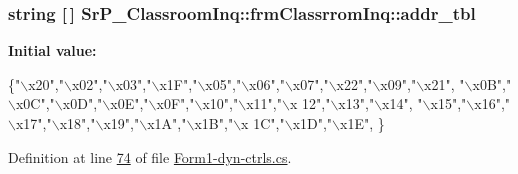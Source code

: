 \hypertarget{class_sr_p___classroom_inq_1_1frm_classrrom_inq_a0f417902be6534cb30d93b2c0d836165}{
\subsubsection[{addr\-\_\-tbl}]{\setlength{\rightskip}{0pt plus 5cm}string \mbox{[}$\,$\mbox{]} {\bf \-Sr\-P\-\_\-\-Classroom\-Inq\-::frm\-Classrrom\-Inq\-::addr\-\_\-tbl}}}
\label{class_sr_p___classroom_inq_1_1frm_classrrom_inq_a0f417902be6534cb30d93b2c0d836165}
{\bfseries \-Initial value\-:}
\begin{DoxyCode}
 \{\textcolor{stringliteral}{"\(\backslash\)x20"},\textcolor{stringliteral}{"\(\backslash\)x02"},\textcolor{stringliteral}{"\(\backslash\)x03"},\textcolor{stringliteral}{"\(\backslash\)x1F"},\textcolor{stringliteral}{"\(\backslash\)x05"},\textcolor{stringliteral}{"\(\backslash\)x06"},\textcolor{stringliteral}{"\(\backslash\)x07"},\textcolor{stringliteral}{"\(\backslash\)x22"},\textcolor{stringliteral}{"\(\backslash\)x09"},\textcolor{stringliteral}{"\(\backslash\)x21"},
                           \textcolor{stringliteral}{"\(\backslash\)x0B"},\textcolor{stringliteral}{"\(\backslash\)x0C"},\textcolor{stringliteral}{"\(\backslash\)x0D"},\textcolor{stringliteral}{"\(\backslash\)x0E"},\textcolor{stringliteral}{"\(\backslash\)x0F"},\textcolor{stringliteral}{"\(\backslash\)x10"},\textcolor{stringliteral}{"\(\backslash\)x11"},\textcolor{stringliteral}{"\(\backslash\)x
      12"},\textcolor{stringliteral}{"\(\backslash\)x13"},\textcolor{stringliteral}{"\(\backslash\)x14"},
                           \textcolor{stringliteral}{"\(\backslash\)x15"},\textcolor{stringliteral}{"\(\backslash\)x16"},\textcolor{stringliteral}{"\(\backslash\)x17"},\textcolor{stringliteral}{"\(\backslash\)x18"},\textcolor{stringliteral}{"\(\backslash\)x19"},\textcolor{stringliteral}{"\(\backslash\)x1A"},\textcolor{stringliteral}{"\(\backslash\)x1B"},\textcolor{stringliteral}{"\(\backslash\)x
      1C"},\textcolor{stringliteral}{"\(\backslash\)x1D"},\textcolor{stringliteral}{"\(\backslash\)x1E"},
                            \}
\end{DoxyCode}


\-Definition at line \hyperlink{_form1-dyn-ctrls_8cs_source_l00074}{74} of file \hyperlink{_form1-dyn-ctrls_8cs_source}{\-Form1-\/dyn-\/ctrls.\-cs}.

